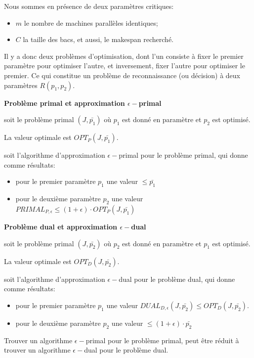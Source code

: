 \documentclass[a4paper,12pt]{report}
\theoremstyle{plain}				%
\theoremstyle{definition}				%
\begin{document}
Nous sommes en présence de deux paramètres critiques:
\begin{itemize}
\item $m$ le nombre de machines parallèles identiques;
\item $C$ la taille des bacs, et aussi, le makespan recherché.
\end{itemize}
Il y a donc deux problèmes d'optimisation,
dont l'un consiste à fixer le premier paramètre pour optimiser l'autre,
et inversement, fixer l'autre pour optimiser le premier.
Ce qui constitue un problème de reconnaissance (ou décision) à deux
paramètres $R(p_1, p_2)$.

\bigskip

\textbf{Problème primal et approximation $\epsilon-$primal}

soit le problème primal $(J,\bar{p_1})$
où $p_1$ est donné en paramètre et $p_2$ est optimisé.

La valeur optimale est $OPT_P(J,\bar{p_1})$.

soit l'algorithme d'approximation $\epsilon-$primal pour le problème
primal, qui donne comme résultats:

\begin{itemize}
\item pour le premier paramètre $p_1$ une valeur $\le \bar{p_1}$
\item pour le deuxième paramètre $p_2$ une valeur $PRIMAL_{P,\epsilon} \le (1+\epsilon)\cdot OPT_P(J,\bar{p_1})$
\end{itemize}
\bigskip

\textbf{Problème dual et approximation $\epsilon-$dual}

soit le problème primal $(J,\bar{p_2})$
où $p_2$ est donné en paramètre et $p_1$ est optimisé.

La valeur optimale est $OPT_D(J,\bar{p_2})$.

soit l'algorithme d'approximation $\epsilon-$dual pour le problème
dual, qui donne comme résultats:

\begin{itemize}
\item pour le premier paramètre $p_1$ une valeur $DUAL_{D,\epsilon}(J, \bar{p_2})\le OPT_D(J,\bar{p_2})$.
\item pour le deuxième paramètre $p_2$ une valeur $ \le (1+\epsilon)\cdot \bar{p_2}$
\end{itemize}

\bigskip

Trouver un algorithme $\epsilon-$primal pour le problème primal,
peut être réduit à trouver un algorithme $\epsilon-$dual pour le problème dual.
\end{document}
